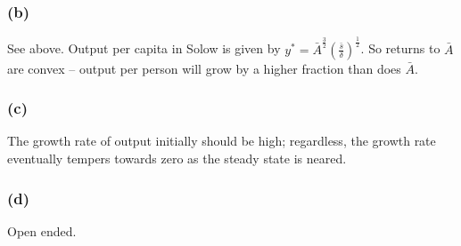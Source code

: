 \documentclass{article}
\begin{document}
\subsubsection*{(b)}

See above. Output per capita in Solow is given by $y^{*} = \bar{A}^{\frac32} \left( \frac{\bar{s}}{\delta} \right)^{\frac12}$. So returns to $\bar{A}$ are convex -- output per person will grow by a higher fraction than does $\bar{A}$.

\subsubsection*{(c)}

The growth rate of output initially should be high; regardless, the growth rate eventually tempers towards zero as the steady state is neared.

\subsubsection*{(d)}

Open ended.
\end{document}
